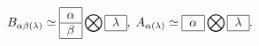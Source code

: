 \begin{equation}
B_{\alpha \beta (\lambda )}\simeq
\begin{tabular}{|l|}
\hline
$\alpha $ \\ \hline
$\beta $ \\ \hline
\end{tabular}
\bigotimes
\begin{tabular}{|l|}
\hline
$\lambda $ \\ \hline
\end{tabular}
,\;A_{\alpha (\lambda )}\simeq
\begin{tabular}{|l|}
\hline
$\alpha $ \\ \hline
\end{tabular}
\bigotimes
\begin{tabular}{|l|}
\hline
$\lambda $ \\ \hline
\end{tabular}
.  \label{young}
\end{equation}

